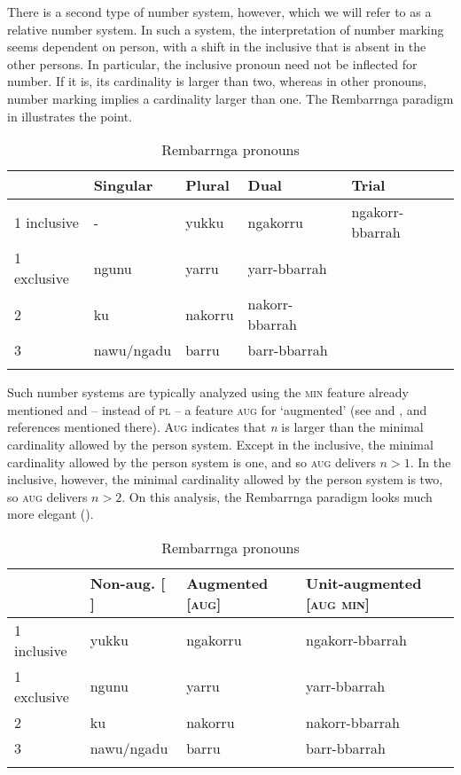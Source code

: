 \documentclass[output=paper]{langsci/langscibook}
\begin{document}
There is a second type of number system, however, which we will refer to as a relative number system. In such a system, the interpretation of number marking seems dependent on person, with a shift in the inclusive that is absent in the other persons. In particular, the inclusive pronoun need not be inflected for number. If it is, its cardinality is larger than two, whereas in other pronouns, number marking implies a cardinality larger than one. The Rembarrnga paradigm in  illustrates the point.

\begin{table}\caption{\label{bkm:Ref451950792}Rembarrnga pronouns\label{tab:01:2}}
\begin{tabularx}{\textwidth}{Xllll}
\lsptoprule
& Singular & Plural & Dual & Trial\\
\midrule
1 inclusive & - & yukku & ngakorru & ngakorr-bbarrah\\
1 exclusive & ngunu & yarru & yarr-bbarrah & \\
2 & ku & nakorru & nakorr-bbarrah & \\
3 & nawu/ngadu & barru & barr-bbarrah & \\
\lspbottomrule
\end{tabularx}
\end{table}

Such number systems are typically analyzed using the \textsc{min} feature already mentioned and – instead of \textsc{pl} – a feature \textsc{aug} for ‘augmented’ (see \citealt{Bobaljik2008Missing} and \citealt{Cysouw2011}, and references mentioned there). \textsc{Aug} indicates that \textit{n} is larger than the minimal cardinality allowed by the person system. Except in the inclusive, the minimal cardinality allowed by the person system is one, and so \textsc{aug} delivers $n>1$. In the inclusive, however, the minimal cardinality allowed by the person system is two, so \textsc{aug} delivers $n>2$. On this analysis, the Rembarrnga paradigm looks much more elegant ().

\begin{table}
\caption{\label{bkm:Ref328732397}\label{bkm:Ref295309335}Rembarrnga pronouns\label{tab:01:3}}
\begin{tabularx}{\textwidth}{Xlll}
\lsptoprule
& Non-aug. [ ] & Augmented [\textsc{aug}] & Unit-augmented [\textsc{aug} \textsc{min}]\\
\midrule
 1 inclusive & yukku & ngakorru & ngakorr-bbarrah\\
 1 exclusive & ngunu & yarru & yarr-bbarrah\\
 2 & ku & nakorru & nakorr-bbarrah\\
 3 & nawu/ngadu & barru & barr-bbarrah\\
\lspbottomrule
\end{tabularx}
\end{table}
\end{document}
